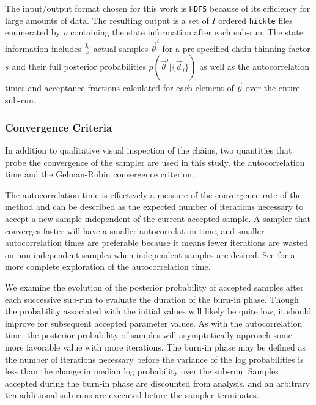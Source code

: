 \documentclass[preprint]{aastex}
\begin{document}
The input/output format chosen for this work is \texttt{HDF5} because of its 
efficiency for large amounts of data.  The resulting output is a set of $I$ 
ordered \texttt{hickle} files enumerated by $\rho$ containing the state 
information after each sub-run.  The state information includes 
$\frac{I_{0}}{s}$ actual samples $\vec{\theta}^{i}$ for a pre-specified chain 
thinning factor $s$ and their full posterior probabilities 
$p(\vec{\theta}^{i}|\{\vec{d}_{j}\})$ as well as the autocorrelation times and 
acceptance fractions calculated for each element of $\vec{\theta}$ over the 
entire sub-run.  

\subsubsection{Convergence Criteria}
\label{sec:acorr}

In addition to qualitative visual inspection of the chains, two quantities that 
probe the convergence of the sampler are used in this study, the 
autocorrelation time and the Gelman-Rubin convergence criterion.

The autocorrelation time is effectively a measure of the convergence rate of 
the method and can be described as the expected number of iterations necessary 
to accept a new sample independent of the current accepted sample.  A sampler 
that converges faster will have a smaller autocorrelation time, and smaller 
autocorrelation times are preferable because it means fewer iterations are 
wasted on non-independent samples when independent samples are desired.  See 
\citet{Foreman-Mackey2013} for a more complete exploration of the 
autocorrelation time.  

We examine the evolution of the posterior probability of accepted samples after 
each successive sub-run to evaluate the duration of the burn-in phase.  Though 
the probability associated with the initial values will likely be quite low, it 
should improve for subsequent accepted parameter values.  As with the 
autocorrelation time, the posterior probability of samples will asymptotically 
approach some more favorable value with more iterations.  The burn-in phase may 
be defined as the number of iterations necessary before the variance of the log 
probabilities is less than the change in median log probability over the 
sub-run.  Samples accepted during the burn-in phase are discounted from 
analysis, and an arbitrary ten additional sub-runs are executed before the 
sampler terminates.  
\end{document}
